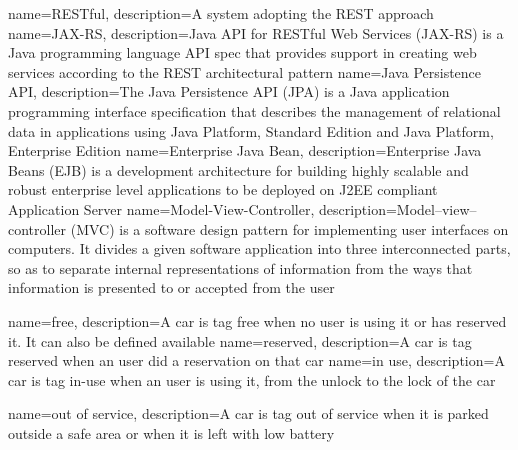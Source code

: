 

{
  name={RESTful},
  description={A system adopting the REST approach}
}
{
  name={JAX-RS},
  description={Java API for RESTful Web Services (JAX-RS)  is a Java programming language API spec that provides support in creating web services according to the REST architectural pattern}
}
{
  name={Java Persistence API},
  description={The Java Persistence API (JPA) is a Java application programming interface specification that describes the management of relational data in applications using Java Platform, Standard Edition and Java Platform, Enterprise Edition}
}
{
  name={Enterprise Java Bean},
  description={Enterprise Java Beans (EJB) is a development architecture for building highly scalable and robust enterprise level applications to be deployed on J2EE compliant Application Server}
}
{
  name={Model-View-Controller},
  description={Model–view–controller (MVC) is a software design pattern for implementing user interfaces on computers. It divides a given software application into three interconnected parts, so as to separate internal representations of information from the ways that information is presented to or accepted from the user}
}

{
	name={free},
	description={A car is tag free when no user is using it or has reserved it. It can also be defined available}
}
{
	name={reserved},
	description={A car is tag reserved when an user did a reservation on that car}
}
{
	name={in use},
	description={A car is tag in-use when an user is using it, from the unlock to the lock of the car}
}

{
	name={out of service},
	description={A car is tag out of service when it is parked outside a safe area or when it is left with low battery}
}

